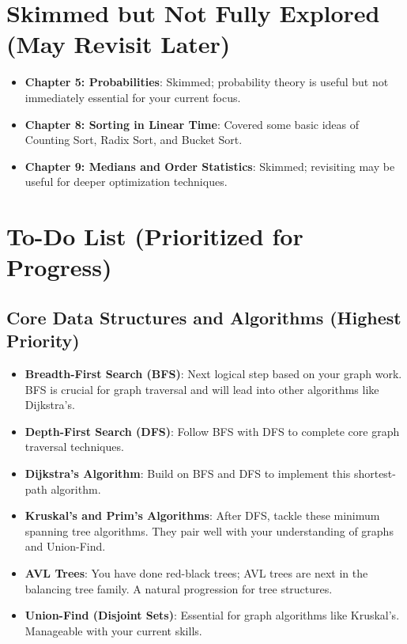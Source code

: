 \documentclass{article}
\begin{document}
\section{Skimmed but Not Fully Explored (May Revisit Later)}
\begin{itemize}
    \item \textbf{Chapter 5: Probabilities}: Skimmed; probability theory is useful but not immediately essential for your current focus.
    \item \textbf{Chapter 8: Sorting in Linear Time}: Covered some basic ideas of Counting Sort, Radix Sort, and Bucket Sort.
    \item \textbf{Chapter 9: Medians and Order Statistics}: Skimmed; revisiting may be useful for deeper optimization techniques.
\end{itemize}

\section{To-Do List (Prioritized for Progress)}

\subsection{Core Data Structures and Algorithms (Highest Priority)}
\begin{itemize}
    \item \textbf{Breadth-First Search (BFS)}: Next logical step based on your graph work. BFS is crucial for graph traversal and will lead into other algorithms like Dijkstra's.
    \item \textbf{Depth-First Search (DFS)}: Follow BFS with DFS to complete core graph traversal techniques.
    \item \textbf{Dijkstra’s Algorithm}: Build on BFS and DFS to implement this shortest-path algorithm.
    \item \textbf{Kruskal’s and Prim’s Algorithms}: After DFS, tackle these minimum spanning tree algorithms. They pair well with your understanding of graphs and Union-Find.
    \item \textbf{AVL Trees}: You have done red-black trees; AVL trees are next in the balancing tree family. A natural progression for tree structures.
    \item \textbf{Union-Find (Disjoint Sets)}: Essential for graph algorithms like Kruskal’s. Manageable with your current skills.
\end{itemize}
\end{document}
